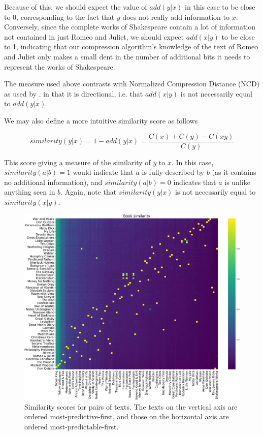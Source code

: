 Because of this, we should expect the value of $add(y|x)$ in this case to be close to 0, corresponding to the fact that $y$ does not really add information to $x$. Conversely, since the complete works of Shakespeare contain a lot of information not contained in just Romeo and Juliet, we should expect $add(x|y)$ to be close to 1, indicating that our compression algorithm's knowledge of the text of Romeo and Juliet only makes a small dent in the number of additional bits it needs to represent the works of Shakespeare.

The measure used above contrasts with Normalized Compression Distance (NCD) as used by \textcite{li2004similarity} , in that it is directional, i.e. that \(add(x|y)\) is not necessarily equal to \(add(y|x)\).

We may also define a more intuitive similarity score as follows

\[similarity(y|x) = 1 - add(y|x) = \frac{C(x) + C(y) - C(xy)}{C(y)}\]

This score giving a measure of the similarity of \(y\) to \(x\). In this case, $similarity(a|b)=1$ would indicate that $a$ is fully described by $b$ (as it contains no additional information), and $similarity(a|b)=0$ indicates that $a$ is unlike anything seen in $b$. Again, note that \(similarity(y|x)\) is not necessarily equal to \(similarity(x|y)\).

\begin{figure}[t]
\centering
\includegraphics[width=\textwidth]{img/fig_co-compression_median.png}
\caption{Similarity scores for pairs of texts. The texts on the vertical axis are ordered most-predictive-first, and those on the horizontal axis are ordered most-predictable-first.}
\label{fig:heatmap_ppsort}
\end{figure}

